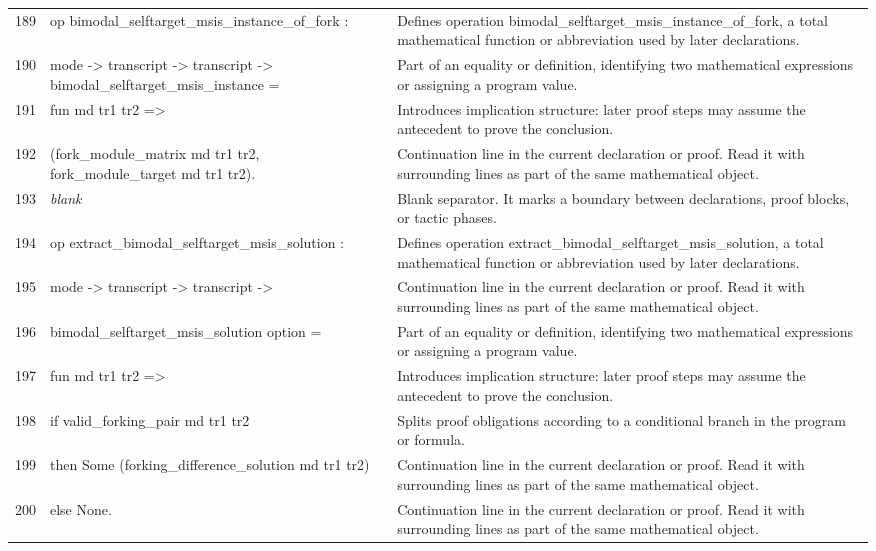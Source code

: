 \documentclass[10pt]{article}
\begin{document}
\begin{longtable}{r L{0.53\textwidth} L{0.37\textwidth}}
189 & {\ttfamily\scriptsize op bimodal\_selftarget\_msis\_instance\_of\_fork :} & Defines operation bimodal\_selftarget\_msis\_instance\_of\_fork, a total mathematical function or abbreviation used by later declarations. \\
190 & {\ttfamily\scriptsize   mode -> transcript -> transcript -> bimodal\_selftarget\_msis\_instance =} & Part of an equality or definition, identifying two mathematical expressions or assigning a program value. \\
191 & {\ttfamily\scriptsize   fun md tr1 tr2 =>} & Introduces implication structure: later proof steps may assume the antecedent to prove the conclusion. \\
192 & {\ttfamily\scriptsize     (fork\_module\_matrix md tr1 tr2, fork\_module\_target md tr1 tr2).} & Continuation line in the current declaration or proof.  Read it with surrounding lines as part of the same mathematical object. \\
193 & {\ttfamily\scriptsize \emph{blank}} & Blank separator.  It marks a boundary between declarations, proof blocks, or tactic phases. \\
194 & {\ttfamily\scriptsize op extract\_bimodal\_selftarget\_msis\_solution :} & Defines operation extract\_bimodal\_selftarget\_msis\_solution, a total mathematical function or abbreviation used by later declarations. \\
195 & {\ttfamily\scriptsize   mode -> transcript -> transcript ->} & Continuation line in the current declaration or proof.  Read it with surrounding lines as part of the same mathematical object. \\
196 & {\ttfamily\scriptsize   bimodal\_selftarget\_msis\_solution option =} & Part of an equality or definition, identifying two mathematical expressions or assigning a program value. \\
197 & {\ttfamily\scriptsize   fun md tr1 tr2 =>} & Introduces implication structure: later proof steps may assume the antecedent to prove the conclusion. \\
198 & {\ttfamily\scriptsize     if valid\_forking\_pair md tr1 tr2} & Splits proof obligations according to a conditional branch in the program or formula. \\
199 & {\ttfamily\scriptsize     then Some (forking\_difference\_solution md tr1 tr2)} & Continuation line in the current declaration or proof.  Read it with surrounding lines as part of the same mathematical object. \\
200 & {\ttfamily\scriptsize     else None.} & Continuation line in the current declaration or proof.  Read it with surrounding lines as part of the same mathematical object. \\

\end{longtable}
\end{document}
